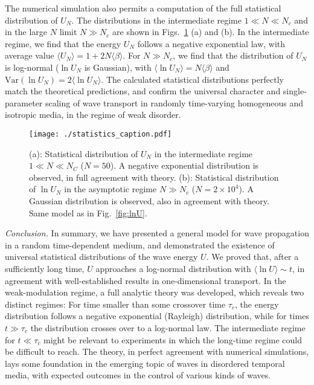 \documentclass[ prl, twocolumn, superscriptaddress, amsfonts, amsmath,floatfix]{revtex4-1}
\begin{document}
The numerical simulation also permits a computation of the full statistical distribution of $U_N$. The distributions in the intermediate regime $1 \ll N \ll N_c$ and in the large $N$ limit $N \gg N_c$ are shown in Figs.~\ref{fig:stat_U} (a) and (b). In the intermediate regime, we find that the energy $U_N$ follows a negative exponential law, with average value $\langle U_N \rangle = 1+2N \langle \beta \rangle$. For $N \gg N_c$, we find that the distribution of $U_N$ is log-normal ($\ln U_N$ is Gaussian), with $\langle \ln U_N \rangle = N \langle \beta \rangle$ and $\mathrm{Var}(\ln U_N) = 2 \langle \ln U_N \rangle$. The calculated statistical distributions perfectly match the theoretical predictions, and confirm the universal character and single-parameter scaling of wave transport in randomly time-varying homogeneous and isotropic media, in the regime of weak disorder.
%
\begin{figure}[h]
     \begin{center}
     \texttt{[image: ./statistics\_caption.pdf]}
     \end{center}    
     \caption{\label{fig:stat_U} (a): Statistical distribution of $U_N$ in the intermediate regime $1 \ll N \ll N_C$ ($N=50$). A negative exponential distribution is observed, in full agreement with theory. 
          (b): Statistical distribution of $\ln U_N$ in the asymptotic regime $N \gg N_c$ ($N=2 \times 10^4$). A Gaussian distribution is observed, also in agreement with theory. Same model as in Fig.~\ref{fig:lnU}.}
\end{figure}
%

{\it Conclusion.}
In summary, we have presented a general model for wave propagation in a random time-dependent medium, and demonstrated the existence of universal statistical distributions of the wave energy $U$. We proved that, after a sufficiently long time, $U$ approaches a log-normal distribution with $\langle \ln U \rangle \sim t$, {in agreement with well-established results in one-dimensional transport.} In the weak-modulation regime, a full analytic theory was developed, which reveals two distinct regimes: For time smaller than some crossover time $\tau_c$, the energy distribution follows a negative exponential (Rayleigh) distribution, while for times $t \gg \tau_c$ the distribution crosses over to a log-normal law. {The intermediate regime for $t \ll \tau_c$ might be relevant to experiments in which the long-time regime could be difficult to reach.} The theory, in perfect agreement with numerical simulations, lays some foundation in the emerging topic of waves in disordered temporal media, with expected outcomes in the control of various kinds of waves.
\end{document}
